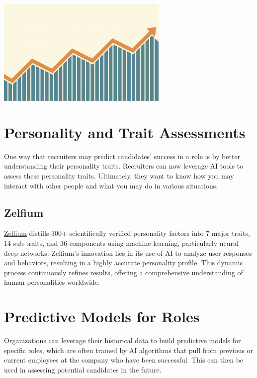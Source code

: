 \documentclass[
]{book}
\begin{document}
\includegraphics[width=3.23958in,height=\textheight]{predict success.jpg}

\hypertarget{personality-and-trait-assessments}{%
\section{Personality and Trait Assessments}\label{personality-and-trait-assessments}}

One way that recruiters may predict candidates' success in a role is by better understanding their personality traits. Recruiters can now leverage AI tools to assess these personality traits. Ultimately, they want to know how you may interact with other people and what you may do in various situations.

\hypertarget{zelfium}{%
\subsection{Zelfium}\label{zelfium}}

\href{https://www.zelfium.com/\#/}{Zelfium} distills 300+ scientifically verified personality factors into 7 major traits, 14 sub-traits, and 36 components using machine learning, particularly neural deep networks. Zelfium's innovation lies in its use of AI to analyze user responses and behaviors, resulting in a highly accurate personality profile. This dynamic process continuously refines results, offering a comprehensive understanding of human personalities worldwide.

\hypertarget{predictive-models-for-roles}{%
\section{Predictive Models for Roles}\label{predictive-models-for-roles}}

Organizations can leverage their historical data to build predictive models for specific roles, which are often trained by AI algorithms that pull from previous or current employees at the company who have been successful. This can then be used in assessing potential candidates in the future.
\end{document}
